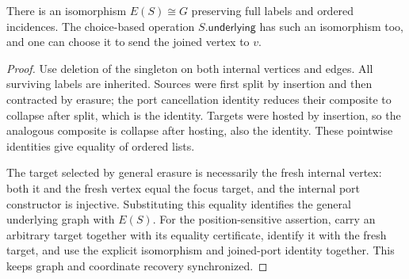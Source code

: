\begin{theorem}
There is an isomorphism $E(S)\cong G$ preserving full labels and ordered
incidences. The choice-based operation $S.\mathsf{underlying}$ has such an
isomorphism too, and one can choose it to send the joined vertex to $v$.
\end{theorem}
\begin{proof}
Use deletion of the singleton on both internal vertices and edges. All
surviving labels are inherited. Sources were first split by insertion and
then contracted by erasure; the port cancellation identity reduces their
composite to collapse after split, which is the identity. Targets were
hosted by insertion, so the analogous composite is collapse after hosting,
also the identity. These pointwise identities give equality of ordered lists.

The target selected by general erasure is necessarily the fresh internal
vertex: both it and the fresh vertex equal the focus target, and the internal
port constructor is injective. Substituting this equality identifies the
general underlying graph with $E(S)$. For the position-sensitive assertion,
carry an arbitrary target together with its equality certificate, identify
it with the fresh target, and use the explicit isomorphism and joined-port
identity together. This keeps graph and coordinate recovery synchronized.
\end{proof}
